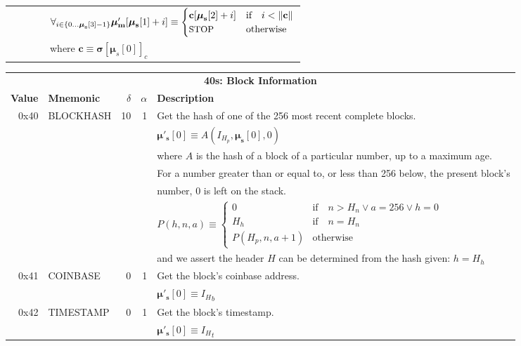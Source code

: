 \documentclass[9pt,oneside]{amsart}
\begin{document}
\begin{tabular*}{\columnwidth}[h]{rlrrl}
&&&& $\forall_{i \in \{ 0 \dots \boldsymbol{\mu}_\mathbf{s}[3] - 1\} } \boldsymbol{\mu}'_\mathbf{m}[\boldsymbol{\mu}_\mathbf{s}[1] + i ] \equiv
\begin{cases} \mathbf{c}[\boldsymbol{\mu}_\mathbf{s}[2] + i] & \text{if} \quad i < \lVert \mathbf{c} \rVert \\ \text{\small STOP} & \text{otherwise} \end{cases}$\\
&&&& where $\mathbf{c} \equiv \boldsymbol{\sigma}[\boldsymbol{\mu}_s[0]]_c$ \\
\bottomrule
\end{tabular*}

\begin{tabular*}{\columnwidth}[h]{rlrrl}
\toprule
\multicolumn{5}{c}{\textbf{40s: Block Information}} \vspace{5pt} \\
\textbf{Value} & \textbf{Mnemonic} & $\delta$ & $\alpha$ & \textbf{Description} \vspace{5pt} \\
0x40 & {\small BLOCKHASH} & 10 & 1 & Get the hash of one of the 256 most recent complete blocks. \\
&&&& $\boldsymbol{\mu}'_\mathbf{s}[0] \equiv A(I_{H_p}, \boldsymbol{\mu}_\mathbf{s}[0], 0)$ \\
&&&& where $A$ is the hash of a block of a particular number, up to a maximum age.\\
&&&& For a number greater than or equal to, or less than 256 below, the present block's\\
&&&& number, 0 is left on the stack.\\
&&&& $P(h, n, a) \equiv \begin{cases} 0 & \text{if} \quad n > H_n \vee a = 256 \vee h = 0 \\ H_h & \text{if} \quad n = H_n \\ P(H_p, n, a + 1) & \text{otherwise} \end{cases}$ \\
&&&& and we assert the header $H$ can be determined from the hash given: $h = H_h$ \\
\midrule
0x41 & {\small COINBASE} & 0 & 1 & Get the block's coinbase address. \\
&&&& $\boldsymbol{\mu}'_\mathbf{s}[0] \equiv {I_H}_b$ \\
\midrule
0x42 & {\small TIMESTAMP} & 0 & 1 & Get the block's timestamp. \\
&&&& $\boldsymbol{\mu}'_\mathbf{s}[0] \equiv {I_H}_t$ \\

\end{tabular*}
\end{document}
